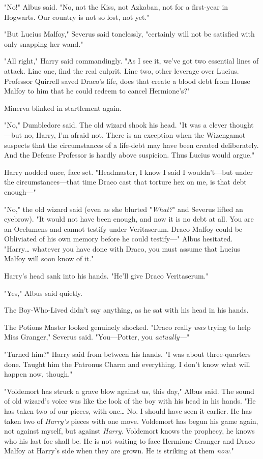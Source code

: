 "No!" Albus said. "No, not the Kiss, not Azkaban, not for a first-year in
Hogwarts. Our country is not so lost, not yet."

"But Lucius Malfoy," Severus said tonelessly, "certainly will not be satisfied
with only snapping her wand."

"All right," Harry said commandingly. "As I see it, we've got two essential
lines of attack. Line one, find the real culprit. Line two, other leverage over
Lucius. Professor Quirrell saved Draco's life, does that create a blood debt
from House Malfoy to him that he could redeem to cancel Hermione's?"

Minerva blinked in startlement again.

"No," Dumbledore said. The old wizard shook his head. "It was a clever
thought---but no, Harry, I'm afraid not. There is an exception when the
Wizengamot suspects that the circumstances of a life-debt may have been created
deliberately. And the Defense Professor is hardly above suspicion. Thus Lucius
would argue."

Harry nodded once, face set. "Headmaster, I know I said I wouldn't---but under
the circumstances---that time Draco cast that torture hex on me, is that debt
enough---"

"No," the old wizard said (even as she blurted "\emph{What?}" and Severus
lifted an eyebrow). "It would not have been enough, and now it is no debt at
all. You are an Occlumens and cannot testify under Veritaserum. Draco Malfoy
could be Obliviated of his own memory before he could testify---" Albus
hesitated. "Harry{\ldots} whatever you have done with Draco, you must assume
that Lucius Malfoy will soon know of it."

Harry's head sank into his hands. "He'll give Draco Veritaserum."

"Yes," Albus said quietly.

The Boy-Who-Lived didn't say anything, as he sat with his head in his hands.

The Potions Master looked genuinely shocked. "Draco really \emph{was} trying to
help Miss Granger," Severus said. "You---Potter, you \emph{actually---}"

"Turned him?" Harry said from between his hands. "I was about three-quarters
done. Taught him the Patronus Charm and everything. I don't know what will
happen now, though."

"Voldemort has struck a grave blow against us, this day," Albus said. The sound
of old wizard's voice was like the look of the boy with his head in his hands.
"He has taken two of our pieces, with one{\ldots} No. I should have seen it
earlier. He has taken two of \emph{Harry's} pieces with one move. Voldemort has
begun his game again, not against myself, but against \emph{Harry}. Voldemort
knows the prophecy, he knows who his last foe shall be. He is not waiting to
face Hermione Granger and Draco Malfoy at Harry's side when they are grown. He
is striking at them \emph{now}."

